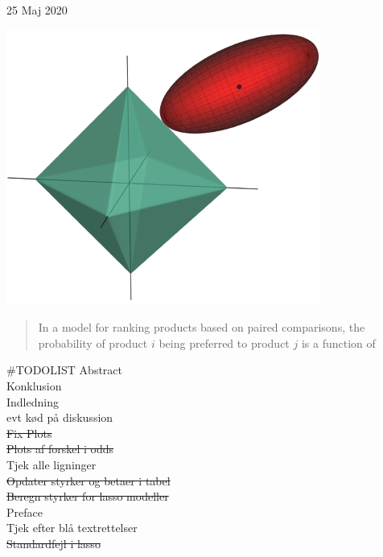 \documentclass[11pt,a4paper]{article}
\renewcommand*\contentsname{Table of Contents}
\begin{document}
\begin{titlepage}
	
	
	\vfill\vfill\vfill %
	
	{\large{25 Maj 2020}} %
	
	
	\includegraphics[width=0.7 \textwidth]{GLR2.png}\\[1cm] %
	 
	
	\vfill %
	
\end{titlepage}
\begin{abstract}
In a model for ranking products based on paired comparisons, the probability of product $i$ being preferred to product $j$ is a function of   
\end{abstract}
\clearpage
\renewcommand{\contentsname}{Indhold}
\clearpage
\tableofcontents
\clearpage
\newpage
{}
\#TODOLIST
Abstract\\
Konklusion\\
Indledning\\
evt kød på diskussion\\
\sout{Fix Plots}\\
\sout{Plots af forskel i odds} \\
Tjek alle ligninger \\
\sout{Opdater styrker og betaer i tabel}\\
\sout{Beregn styrker for lasso modeller} \\
Preface \\
Tjek efter blå textrettelser \\
\sout{Standardfejl i lasso} \\
\end{document}

